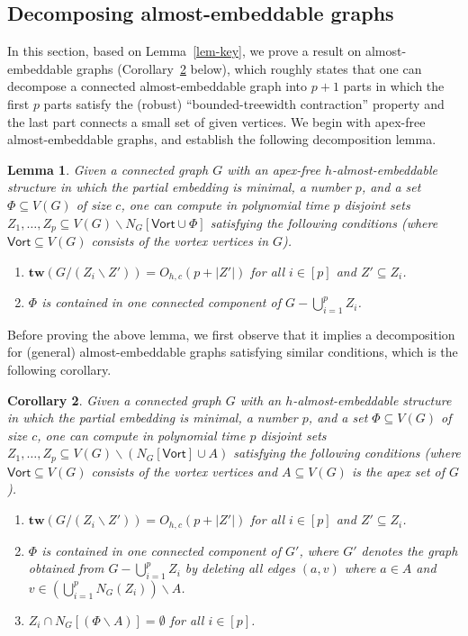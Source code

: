 \documentclass[a4paper,11pt]{article}
\newtheorem{lemma}{Lemma}
\numberwithin{lemma}{section}
\newtheorem{corollary}[lemma]{Corollary}
\newcommand{\tw}{\mathbf{tw}}
\begin{document}
\subsection{Decomposing almost-embeddable graphs}
In this section, based on Lemma~\ref{lem-key}, we prove a result on almost-embeddable graphs (Corollary~\ref{cor-decomp2} below), which roughly states that one can decompose a connected almost-embeddable graph into $p+1$ parts in which the first $p$ parts satisfy the (robust) ``bounded-treewidth contraction'' property and the last part connects a small set of given vertices.
We begin with apex-free almost-embeddable graphs, and establish the following decomposition lemma.

\begin{lemma} \label{lem-decomp1}
Given a connected graph $G$ with an apex-free $h$-almost-embeddable structure in which the partial embedding is minimal, a number $p$, and a set $\varPhi \subseteq V(G)$ of size $c$, one can compute in polynomial time $p$ disjoint sets $Z_1,\dots,Z_p \subseteq V(G) \backslash N_G[\mathsf{Vort} \cup \varPhi]$ satisfying the following conditions (where $\mathsf{Vort} \subseteq V(G)$ consists of the vortex vertices in $G$).
\begin{enumerate}[label = (\arabic*)]
    \item\label{item:decomp1-1} $\tw(G/(Z_i \backslash Z')) = O_{h,c}(p+|Z'|)$ for all $i \in [p]$ and $Z' \subseteq Z_i$.
    \item\label{item:decomp1-2} $\varPhi$ is contained in one connected component of $G - \bigcup_{i=1}^p Z_i$.
\end{enumerate}
\end{lemma}

Before proving the above lemma, we first observe that it implies a decomposition for (general) almost-embeddable graphs satisfying similar conditions, which is the following corollary.

\begin{corollary} \label{cor-decomp2}
Given a connected graph $G$ with an $h$-almost-embeddable structure in which the partial embedding is minimal, a number $p$, and a set $\varPhi \subseteq V(G)$ of size $c$, one can compute in polynomial time $p$ disjoint sets $Z_1,\dots,Z_p \subseteq V(G) \backslash (N_G[\mathsf{Vort}] \cup A)$ satisfying the following conditions (where $\mathsf{Vort} \subseteq V(G)$ consists of the vortex vertices and $A \subseteq V(G)$ is the apex set of $G$).
\begin{enumerate}[label = (\arabic*)]
    \item\label{item:decomp2-1} $\tw(G/(Z_i \backslash Z')) = O_{h,c}(p+|Z'|)$ for all $i \in [p]$ and $Z' \subseteq Z_i$.
    \item\label{item:decomp2-2} $\varPhi$ is contained in one connected component of $G'$, where $G'$ denotes the graph obtained from $G - \bigcup_{i=1}^p Z_i$ by deleting all edges $(a,v)$ where $a \in A$ and $v \in (\bigcup_{i=1}^p N_G(Z_i)) \backslash A$.
    \item\label{item:decomp2-3} $Z_i \cap N_G[(\varPhi \backslash A)] = \emptyset$ for all $i \in [p]$.
\end{enumerate}
\end{corollary}
\end{document}
